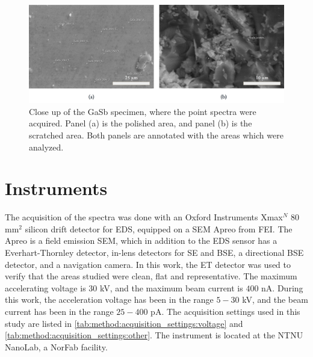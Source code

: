 \begin{figure}[htbp]
    \centering
    \includegraphics[width=.99\textwidth]{figures/SE_images/GaSb_close.jpg}
    \caption{
        Close up of the GaSb specimen, where the point spectra were acquired.
        Panel (a) is the polished area, and panel (b) is the scratched area.
        Both panels are annotated with the areas which were analyzed.
    }
    \label{fig:SE_images:GaSb}
\end{figure}


















\section{Instruments}
\label{method:instruments}

The acquisition of the spectra was done with an Oxford Instruments Xmax$^N$ $80$ mm$^2$ silicon drift detector for EDS, equipped on a SEM Apreo from FEI.
The Apreo is a field emission SEM, which in addition to the EDS sensor has a Everhart-Thornley detector, in-lens detectors for SE and BSE, a directional BSE detector, and a navigation camera.
In this work, the ET detector was used to verify that the areas studied were clean, flat and representative.
The maximum accelerating voltage is $30$ kV, and the maximum beam current is $400$ nA.
During this work, the acceleration voltage has been in the range $5-30$ kV, and the beam current has been in the range $25-400$ pA.
The acquisition settings used in this study are listed in \cref{tab:method:acquisition_settings:voltage} and \cref{tab:method:acquisition_settings:other}.
The instrument is located at the NTNU NanoLab, a NorFab facility.

